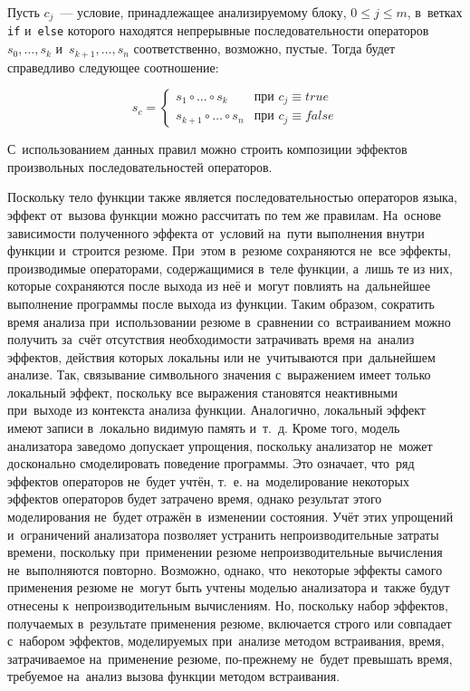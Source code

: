 Пусть $c_j$~--- условие, принадлежащее анализируемому блоку, $0 \leqslant j \leqslant m$, в~ветках \texttt{if} и~\texttt{else} которого находятся непрерывные последовательности операторов $s_0, \ldots, s_k$ и~$s_{k+1}, \ldots, s_n$ соответственно, возможно, пустые. Тогда будет справедливо следующее соотношение:

\begin{equation}
    s_c  =
     \left\{
    \begin{matrix}
    s_1 \circ \ldots \circ s_k & \text{при } c_j \equiv true \\
    s_{k+1} \circ \ldots \circ s_n & \text{при } c_j \equiv false
    \end{matrix} \right.
\end{equation}

С~использованием данных правил можно строить композиции эффектов произвольных последовательностей операторов.

Поскольку тело функции также является последовательностью операторов языка, эффект от~вызова функции можно рассчитать по тем же правилам. На~основе зависимости полученного эффекта от~условий на~пути выполнения внутри функции и~строится резюме. При~этом в~резюме сохраняются не~все эффекты, производимые операторами, содержащимися в~теле функции, а~лишь те из них, которые сохраняются после выхода из неё и~могут повлиять на~дальнейшее выполнение программы после выхода из функции. Таким образом, сократить время анализа при~использовании резюме в~сравнении со~встраиванием можно получить за~счёт отсутствия необходимости затрачивать время на~анализ эффектов, действия которых локальны или не~учитываются при~дальнейшем анализе. Так, связывание символьного значения с~выражением имеет только локальный эффект, поскольку все выражения становятся неактивными при~выходе из контекста анализа функции. Аналогично, локальный эффект имеют записи в~локально видимую память и~т.~д. Кроме того, модель анализатора заведомо допускает упрощения, поскольку анализатор не~может досконально смоделировать поведение программы. Это означает, что~ряд эффектов операторов не~будет учтён, т.~е. на~моделирование некоторых эффектов операторов будет затрачено время, однако результат этого моделирования не~будет отражён в~изменении состояния. Учёт этих упрощений и~ограничений анализатора позволяет устранить непроизводительные затраты времени, поскольку при~применении резюме непроизводительные вычисления не~выполняются повторно. Возможно, однако, что~некоторые эффекты самого применения резюме не~могут быть учтены моделью анализатора и~также будут отнесены к~непроизводительным вычислениям. Но, поскольку набор эффектов, получаемых в~результате применения резюме, включается строго или совпадает с~набором эффектов, моделируемых при~анализе методом встраивания, время, затрачиваемое на~применение резюме, по-прежнему не~будет превышать время, требуемое на~анализ вызова функции методом встраивания.


